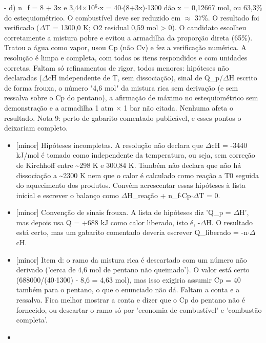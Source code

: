 \documentclass{article}%
\begin{document}
{-} d) n\_f = 8 + 3x e 3,44$\times$10$^{6}$$\cdot$x = 40$\cdot$(8+3x)$\cdot$1300 dão x = 0,12667 mol, ou 63,3\% do estequiométrico. O combustível deve ser reduzido em $\approx$ 37\%. O resultado foi verificado ($\Delta$T = 1300,0 K; O2 residual 0,59 mol > 0).\newline%
\newline%
O candidato escolheu corretamente a mistura pobre e evitou a armadilha da proporção direta (65\%). Tratou a água como vapor, usou Cp (não Cv) e fez a verificação numérica. A resolução é limpa e completa, com todos os itens respondidos e com unidades corretas.\newline%
\newline%
Faltam só refinamentos de rigor, todos menores: hipóteses não declaradas ($\Delta$cH independente de T, sem dissociação), sinal de Q\_p/$\Delta$H escrito de forma frouxa, o número "4,6 mol" da mistura rica sem derivação (e sem ressalva sobre o Cp do pentano), a afirmação de máximo no estequiométrico sem demonstração e a armadilha 1 atm $\times$ 1 bar não citada. Nenhuma afeta o resultado. Nota 9: perto de gabarito comentado publicável, e esses pontos o deixariam completo.%
\begin{itemize}%
\item%
{[}minor{]} Hipóteses incompletas. A resolução não declara que $\Delta$cH = -3440 kJ/mol é tomado como independente da temperatura, ou seja, sem correção de Kirchhoff entre \textasciitilde{}298 K e 300,84 K. Também não declara que não há dissociação a \textasciitilde{}2300 K nem que o calor é calculado como reação a T0 seguida do aquecimento dos produtos. Convém acrescentar essas hipóteses à lista inicial e escrever o balanço como $\Delta$H\_reação + n\_f$\cdot$Cp$\cdot$$\Delta$T = 0.%
\item%
{[}minor{]} Convenção de sinais frouxa. A lista de hipóteses diz 'Q\_p = $\Delta$H', mas depois usa Q = +688 kJ como calor liberado, isto é, -$\Delta$H. O resultado está certo, mas um gabarito comentado deveria escrever Q\_liberado = -n$\cdot$$\Delta$cH.%
\item%
{[}minor{]} Item d: o ramo da mistura rica é descartado com um número não derivado ('cerca de 4,6 mol de pentano não queimado'). O valor está certo (688000/(40$\cdot$1300) - 8,6 = 4,63 mol), mas isso exigiria assumir Cp = 40 também para o pentano, o que o enunciado não dá. Faltam a conta e a ressalva. Fica melhor mostrar a conta e dizer que o Cp do pentano não é fornecido, ou descartar o ramo só por 'economia de combustível' e 'combustão completa'.%
\item%

\end{itemize}$$
\end{document}
